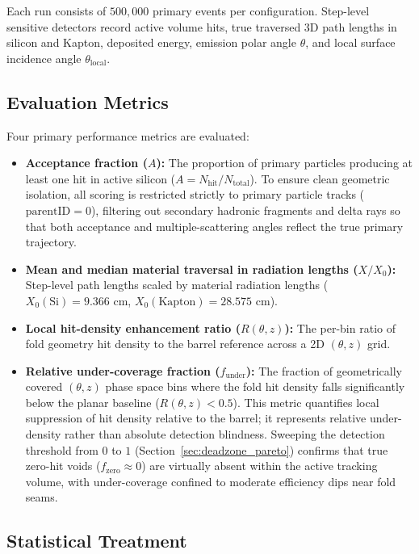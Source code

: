\documentclass[a4paper,11pt]{article}
\begin{document}
Each run consists of $500{,}000$ primary events per configuration. Step-level sensitive detectors record active volume hits, true traversed 3D path lengths in silicon and Kapton, deposited energy, emission polar angle $\theta$, and local surface incidence angle $\theta_{\text{local}}$.

\subsection{Evaluation Metrics}
\label{sec:metrics}

Four primary performance metrics are evaluated:
\begin{itemize}
    \item \textbf{Acceptance fraction ($A$):} The proportion of primary particles producing at least one hit in active silicon ($A = N_{\text{hit}} / N_{\text{total}}$). To ensure clean geometric isolation, all scoring is restricted strictly to primary particle tracks ($\text{parentID} = 0$), filtering out secondary hadronic fragments and delta rays so that both acceptance and multiple-scattering angles reflect the true primary trajectory.
    \item \textbf{Mean and median material traversal in radiation lengths ($X/X_0$):} Step-level path lengths scaled by material radiation lengths ($X_0(\text{Si}) = 9.366\text{ cm}$, $X_0(\text{Kapton}) = 28.575\text{ cm}$).
    \item \textbf{Local hit-density enhancement ratio ($R(\theta, z)$):} The per-bin ratio of fold geometry hit density to the barrel reference across a 2D $(\theta, z)$ grid.
    \item \textbf{Relative under-coverage fraction ($f_{\text{under}}$):} The fraction of geometrically covered $(\theta, z)$ phase space bins where the fold hit density falls significantly below the planar baseline ($R(\theta, z) < 0.5$). This metric quantifies local suppression of hit density relative to the barrel; it represents relative under-density rather than absolute detection blindness. Sweeping the detection threshold from $0$ to $1$ (Section~\ref{sec:deadzone_pareto}) confirms that true zero-hit voids ($f_{\text{zero}} \approx 0$) are virtually absent within the active tracking volume, with under-coverage confined to moderate efficiency dips near fold seams.
\end{itemize}

\subsection{Statistical Treatment}
\label{sec:statistics}
\end{document}
